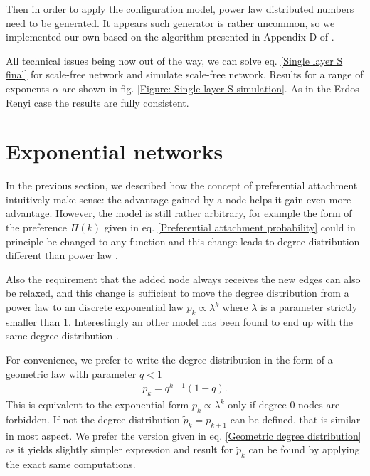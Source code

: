 \documentclass[
11pt, %
american, %
singlespacing, %
final, %
nolistspacing, %
liststotoc, %
headsepline, %
]{MastersDoctoralThesis} %
\begin{document}
Then in order to apply the configuration model, power law distributed numbers need to be generated. It appears such generator is rather uncommon, so we implemented our own based on the algorithm presented in Appendix D of \cite{clauset2009power}.

All technical issues being now out of the way, we can solve eq. \eqref{Single layer S final} for scale-free network and simulate scale-free network. Results for a range of exponents $\alpha$ are shown in fig. \ref{Figure: Single layer S simulation}. As in the Erdos-Renyi case the results are fully consistent.

\section{Exponential networks}
\label{Section: Exponential networks}

In the previous section, we described how the concept of preferential attachment intuitively make sense: the advantage gained by a node helps it gain even more advantage. However, the model is still rather arbitrary, for example the form of the preference $\Pi(k)$ given in eq. \eqref{Preferential attachment probability} could in principle be changed to any function and this change leads to degree distribution different than power law \cite{krapivsky2000connectivity}.

Also the requirement that the added node always receives the new edges can also be relaxed, and this change is sufficient to move the degree distribution from a power law to an discrete exponential law $p_k \propto \lambda^{k}$ \cite{callaway2001randomly} where $\lambda$ is a parameter strictly smaller than $1$. Interestingly an other model has been found to end up with the same degree distribution \cite{jing2005exponential}.

For convenience, we prefer to write the degree distribution in the form of a geometric law with parameter $q < 1$
\begin{align}
	p_k = q^{k-1} (1 - q). \label{Geometric degree distribution}
\end{align}
This is equivalent to the exponential form $p_k \propto \lambda^{k}$ only if degree $0$ nodes are forbidden. If not the degree distribution $\tilde{p}_k = p_{k + 1}$ can be defined, that is similar in most aspect. We prefer the version given in eq. \eqref{Geometric degree distribution} as it yields slightly simpler expression and result for $\tilde{p}_k$ can be found by applying the exact same computations.
\end{document}
